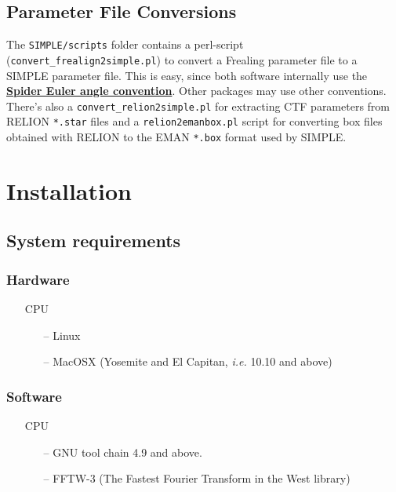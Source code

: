 \documentclass[a4paper,11pt]{article}
\begin{document}
\subsection{Parameter File Conversions}
The \texttt{SIMPLE/scripts} folder contains a perl-script (\texttt{convert\_frealign2simple.pl}) to convert a Frealing parameter file to a SIMPLE parameter file. This is easy, since both software internally use the \href{http://spider.wadsworth.org/spider_doc/spider/docs/euler.html}{\textbf{\textcolor{BurntOrange}{Spider Euler angle convention}}}. Other packages may use other conventions. There's also a \texttt{convert\_relion2simple.pl} for extracting CTF parameters from RELION \texttt{*.star} files and a \texttt{relion2emanbox.pl} script for converting box files obtained with RELION to the EMAN \texttt{*.box} format used by SIMPLE.

\section{Installation}
\label{install}

\subsection{System requirements}
\label{sysreq}

\subsubsection{Hardware}
\label{hardware}

\begin{itemize}
	\item [CPU]
	\begin{itemize}
		\item[--] Linux
		\item[--] MacOSX (Yosemite and El Capitan, \textit{i.e.} 10.10 and above)
	\end{itemize}
\end{itemize}

\subsubsection{Software}
\label{soft}

\begin{itemize}
	\item [CPU]
	\begin{itemize}
		\item[--] GNU tool chain 4.9 and above.
		\item[--] FFTW-3 (The Fastest Fourier Transform in the West library)
	\end{itemize}
\end{itemize}
\end{document}

